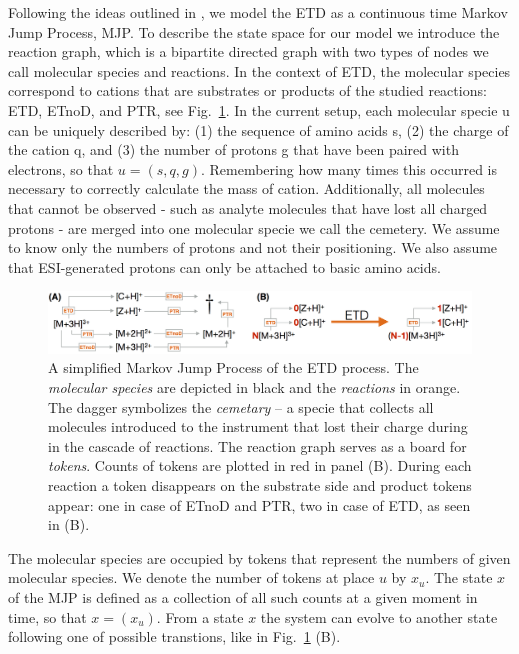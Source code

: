 \documentclass{llncs}
\begin{document}
        Following the ideas outlined in \cite{Gambin2010}, we model the ETD as a continuous time Markov Jump Process, MJP. To describe the state space for our model we introduce the reaction graph, which is a bipartite directed graph with two types of nodes we call molecular species and reactions. In the context of ETD, the molecular species correspond to cations that are substrates or products of the studied reactions: ETD, ETnoD, and PTR, see Fig.~\ref{img::petrinet}. In the current setup, each molecular specie u can be uniquely described by: (1) the sequence of amino acids s, (2) the charge of the cation q, and (3) the number of protons g that have been paired with electrons, so that $u = (s,q,g)$. Remembering how many times this occurred is necessary to correctly calculate the mass of cation.  Additionally, all molecules that cannot be observed - such as analyte molecules that have lost all charged protons - are merged into one molecular specie we call the cemetery. We assume to know only the numbers of protons and not their positioning. We also assume that ESI-generated protons can only be attached to basic amino acids.
\begin{figure}[h]
        \center
        \includegraphics[width=\textwidth]{petrinet.png}
        \caption{A simplified Markov Jump Process of the ETD process. The \textit{molecular species} are depicted in black and the \textit{reactions} in orange. The dagger symbolizes the \textit{cemetary} -- a specie that collects all molecules introduced to the instrument that lost their charge during in the cascade of reactions. The reaction graph serves as a board for \textit{tokens}. Counts of tokens are plotted in red in panel (B). During each reaction a token disappears on the substrate side and product tokens appear: one in case of ETnoD and PTR, two in case of ETD, as seen in (B).}\label{img::petrinet}
\end{figure}

        The molecular species are occupied by tokens that represent the numbers of given molecular species. We denote the number of tokens at place $u$ by $x_u$. The state $x$ of the MJP is defined as a collection of all such counts at a given moment in time, so that $x = (x_u)$.  From a state $x$ the system can evolve to another state following one of possible transtions, like in Fig.~\ref{img::petrinet} (B).
\end{document}
